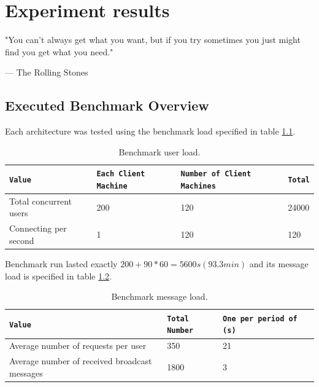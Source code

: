 \documentclass{uvamscse}
\begin{document}
\chapter{Experiment results}\label{Experiment results}

\epigraph{"You can't always get what you want, but if you try sometimes you just might find
you get what you need."}{--- The Rolling Stones}

\section{Executed Benchmark Overview}

Each architecture was tested using the benchmark load specified in table \ref{table:benchload}.

\begin{table}[H]
\begin{center}
\begin{tabular}{llll}
  \texttt{Value}          & \texttt{Each Client Machine}        & \texttt{Number of Client Machines}  & \texttt{Total}\\
  \hline
  Total concurrent users  & 200                         & 120                         & 24000         \\
  Connecting per second   & 1                           & 120                         & 120           \\
\end{tabular}
\end{center}
\caption{Benchmark user load.}
\label{table:benchload}
\end{table}

Benchmark run lasted exactly $200 + 90 * 60 = 5600s (93.3min)$ and its message load is specified in table \ref{table:benchload2}.

\begin{table}[H]
\begin{center}
\begin{tabular}{llll}
  \texttt{Value}          & \texttt{Total Number}        & \texttt{One per period of (s)} \\
  \hline
  Average number of requests per user  & 350   & 21\\
  Average number of received broadcast messages  & 1800   & 3                     \\
\end{tabular}
\end{center}
\caption{Benchmark message load.}
\label{table:benchload2}
\end{table}
\end{document}
